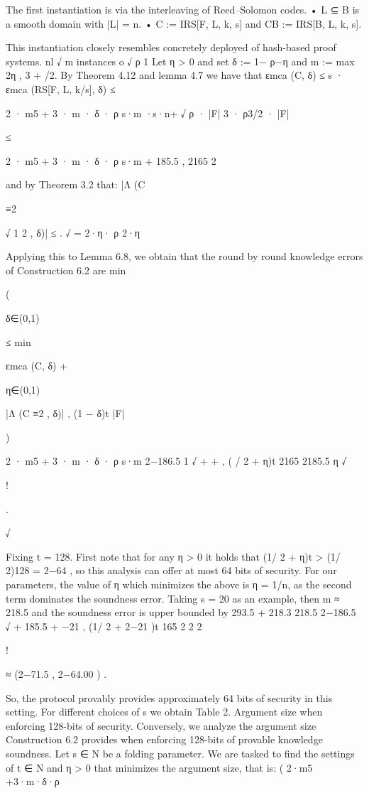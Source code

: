 \documentclass[11pt]{article}
\begin{document}
The first instantiation is via the interleaving of Reed–Solomon codes.
• L ⊆ B is a smooth domain with |L| = n.
• C := IRS[F, L, k, s] and CB := IRS[B, L, k, s].

This instantiation closely resembles concretely deployed
of hash-based proof systems.
nl √ m instances
o
√
ρ
1
Let η > 0 and set δ := 1− ρ−η and m := max
2η , 3 + /2. By Theorem 4.12 and lemma 4.7
we have that
εmca (C, δ) ≤ s · εmca (RS[F, L, k/s], δ)
≤

2 · m5 + 3 · m · δ · ρ
s·m
·s·n+ √
ρ · |F|
3 · ρ3/2 · |F|

≤

2 · m5 + 3 · m · δ · ρ
s·m
+ 185.5 ,
2165
2

and by Theorem 3.2 that:
|Λ (C

≡2

√
1
2
, δ)| ≤
.
√ =
2·η· ρ
2·η

Applying this to Lemma 6.8, we obtain that the round by round knowledge errors of Construction 6.2 are
min

(

δ∈(0,1)

≤ min

εmca (C, δ) +

η∈(0,1)

|Λ (C ≡2 , δ)|
, (1 − δ)t
|F|

)

2 · m5 + 3 · m · δ · ρ
s·m
2−186.5 1 √
+
+
, ( / 2 + η)t
2165
2185.5
η
√

!

.

√

Fixing t = 128. First note that for any η > 0 it holds that (1/ 2 + η)t > (1/ 2)128 = 2−64 , so this
analysis can offer at most 64 bits of security. For our parameters, the value of η which minimizes
the above is η = 1/n, as the second term dominates the soundness error.
Taking s = 20 as an example, then m ≈ 218.5 and the soundness error is upper bounded by
293.5 + 218.3
218.5
2−186.5
√
+ 185.5 + −21 , (1/ 2 + 2−21 )t
165
2
2
2

!

≈ (2−71.5 , 2−64.00 ) .

So, the protocol provably provides approximately 64 bits of security in this setting.
For different choices of s we obtain Table 2.
Argument size when enforcing 128-bits of security. Conversely, we analyze the argument
size Construction 6.2 provides when enforcing 128-bits of provable knowledge soundness. Let s ∈ N
be a folding parameter. We are tasked to find the settings of t ∈ N and η > 0 that minimizes the
argument size, that is:
( 2·m5 +3·m·δ·ρ
\end{document}
